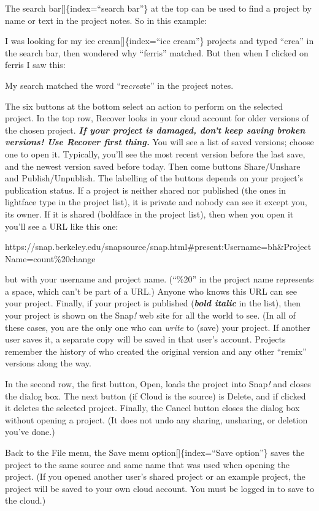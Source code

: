 \documentclass[
  letterpaper,
]{book}
\begin{document}
The search bar{[}{]}\{index=``search bar''\} at the top can be used to
find a project by name or text in the project notes. So in this example:

I was looking for my ice cream{[}{]}\{index=``ice cream''\} projects and
typed ``crea'' in the search bar, then wondered why ``ferris'' matched.
But then when I clicked on ferris I saw this:

My search matched the word ``re\emph{crea}te'' in the project notes.

The six buttons at the bottom select an action to perform on the
selected project. In the top row, Recover looks in your cloud account
for older versions of the chosen project. \textbf{\emph{If your project
is damaged, don't keep saving broken versions! Use Recover first
thing.}} You will see a list of saved versions; choose one to open it.
Typically, you'll see the most recent version before the last save, and
the newest version saved before today. Then come buttons Share/Unshare
and Publish/Unpublish. The labelling of the buttons depends on your
project's publication status. If a project is neither shared nor
published (the ones in lightface type in the project list), it is
private and nobody can see it except you, its owner. If it is shared
(boldface in the project list), then when you open it you'll see a URL
like this one:

https://snap.berkeley.edu/snapsource/snap.html\#present:Username=bh\&ProjectName=count\%20change

but with your username and project name. (``\%20'' in the project name
represents a space, which can't be part of a URL.) Anyone who knows this
URL can see your project. Finally, if your project is published
(\textbf{\emph{bold italic}} in the list), then your project is shown on
the Snap\emph{!} web site for all the world to see. (In all of these
cases, you are the only one who can \emph{write} to (save) your project.
If another user saves it, a separate copy will be saved in that user's
account. Projects remember the history of who created the original
version and any other ``remix'' versions along the way.

In the second row, the first button, Open, loads the project into
Snap\emph{!} and closes the dialog box. The next button (if Cloud is the
source) is Delete, and if clicked it deletes the selected project.
Finally, the Cancel button closes the dialog box without opening a
project. (It does not undo any sharing, unsharing, or deletion you've
done.)

Back to the File menu, the Save menu option{[}{]}\{index=``Save
option''\} saves the project to the same source and same name that was
used when opening the project. (If you opened another user's shared
project or an example project, the project will be saved to your own
cloud account. You must be logged in to save to the cloud.)
\end{document}
